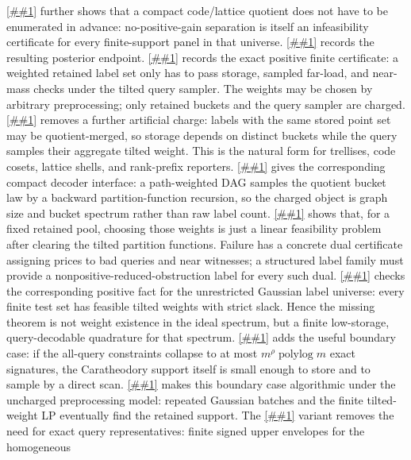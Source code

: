 \documentclass[10pt]{article}
\newcommand{\cref}[1]{\ref{##1}}
\newcommand{\Cref}[1]{\ref{##1}}
\theoremstyle{definition}
\newcommand{\polylog}{\operatorname{polylog}}
\begin{document}
\cref{lem:implicit-reduced-gain-separation} further shows that a compact
code/lattice quotient does not have to be enumerated in advance: no-positive-gain
separation is itself an infeasibility certificate for every finite-support
panel in that universe.
\Cref{prop:rate-coverage-polylog} records the resulting posterior endpoint.
\Cref{cor:weighted-gaussian-quadrature-panel} records the exact positive
finite certificate: a weighted retained label set only has to pass storage,
sampled far-load, and near-mass checks under the tilted query sampler.  The
weights may be chosen by arbitrary preprocessing; only retained buckets and the
query sampler are charged.
\Cref{cor:bucket-quotient-quadrature} removes a further artificial charge:
labels with the same stored point set may be quotient-merged, so storage
depends on distinct buckets while the query samples their aggregate tilted
weight.  This is the natural form for trellises, code cosets, lattice shells,
and rank-prefix reporters.
\Cref{lem:compressed-aggregate-sampler} gives the corresponding compact
decoder interface: a path-weighted DAG samples the quotient bucket law by a
backward partition-function recursion, so the charged object is graph size and
bucket spectrum rather than raw label count.
\Cref{lem:tilted-weight-linear-feasibility} shows that, for a fixed retained
pool, choosing those weights is just a linear feasibility problem after
clearing the tilted partition functions.  Failure has a concrete dual
certificate assigning prices to bad queries and near witnesses; a structured
label family must provide a nonpositive-reduced-obstruction label for every
such dual.
\Cref{lem:continuous-gaussian-finite-witness} checks the corresponding
positive fact for the unrestricted Gaussian label universe: every finite test
set has feasible tilted weights with strict slack.  Hence the missing theorem
is not weight existence in the ideal spectrum, but a finite low-storage,
query-decodable quadrature for that spectrum.
\Cref{cor:small-signature-gaussian-quadrature} adds the useful boundary case:
if the all-query constraints collapse to at most \(m^\rho\polylog m\) exact
signatures, the Caratheodory support itself is small enough to store and to
sample by a direct scan.
\Cref{prop:las-vegas-small-signature-gaussian} makes this boundary case
algorithmic under the uncharged preprocessing model: repeated Gaussian batches
and the finite tilted-weight LP eventually find the retained support.  The
\Cref{prop:finite-envelope-gaussian-quadrature} variant removes the need for
exact query representatives: finite signed upper envelopes for the homogeneous
\end{document}
